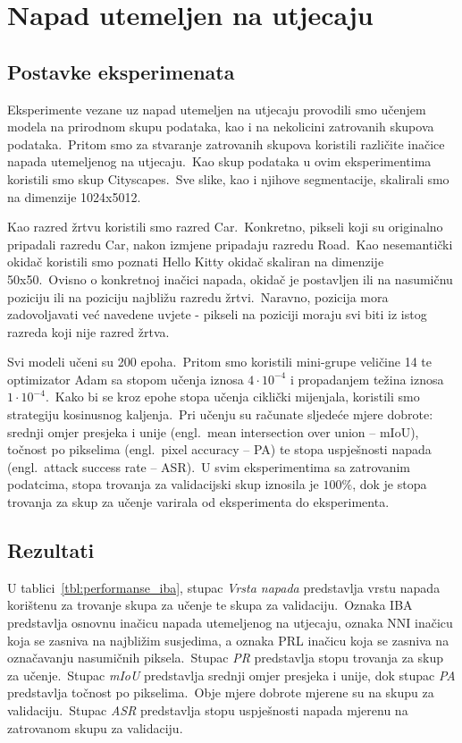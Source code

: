 \documentclass[times, utf8, seminar, numeric]{fer}
\begin{document}
\section{Napad utemeljen na utjecaju}

\subsection{Postavke eksperimenata}

Eksperimente vezane uz napad utemeljen na utjecaju provodili smo učenjem modela na prirodnom skupu podataka, kao i na nekolicini zatrovanih skupova podataka.\ 
Pritom smo za stvaranje zatrovanih skupova koristili različite inačice napada utemeljenog na utjecaju.\ Kao skup podataka u ovim eksperimentima koristili smo skup Cityscapes.\ 
Sve slike, kao i njihove segmentacije, skalirali smo na dimenzije 1024x5012.\ 
  
Kao razred žrtvu koristili smo razred Car.\ Konkretno, pikseli koji su originalno pripadali razredu Car, nakon izmjene pripadaju razredu Road.\ 
Kao nesemantički okidač koristili smo poznati Hello Kitty okidač skaliran na dimenzije 50x50.\ 
Ovisno o konkretnoj inačici napada, okidač je postavljen ili na nasumičnu poziciju ili na poziciju najbližu razredu žrtvi.\ 
Naravno, pozicija mora zadovoljavati već navedene uvjete - pikseli na poziciji moraju svi biti iz istog razreda koji nije razred žrtva.\ 
  
Svi modeli učeni su 200 epoha.\ Pritom smo koristili mini-grupe veličine 14 te optimizator Adam sa stopom učenja iznosa $4 \cdot 10^{-4}$ i propadanjem težina iznosa $1 \cdot 10^{-4}$.\
Kako bi se kroz epohe stopa učenja ciklički mijenjala, koristili smo strategiju kosinusnog kaljenja.\ 
Pri učenju su računate sljedeće mjere dobrote: srednji omjer presjeka i unije (engl.\ mean intersection over union – mIoU), točnost po pikselima (engl.\ pixel accuracy – PA) te stopa uspješnosti napada (engl.\ attack success rate – ASR).\ 
U svim eksperimentima sa zatrovanim podatcima, stopa trovanja za validacijski skup iznosila je $100\%$, dok je stopa trovanja za skup za učenje varirala od eksperimenta do eksperimenta.\ 

\pagebreak

\subsection{Rezultati}

U tablici~\ref{tbl:performanse_iba}, stupac \textit{Vrsta napada} predstavlja vrstu napada korištenu za trovanje skupa za učenje te skupa za validaciju.\ 
Oznaka IBA predstavlja osnovnu inačicu napada utemeljenog na utjecaju, oznaka NNI inačicu koja se zasniva na najbližim susjedima, a oznaka PRL inačicu koja se zasniva na označavanju nasumičnih piksela.\ 
Stupac \textit{PR} predstavlja stopu trovanja za skup za učenje.\ Stupac \textit{mIoU} predstavlja srednji omjer presjeka i unije, dok stupac \textit{PA} predstavlja točnost po pikselima.\ 
Obje mjere dobrote mjerene su na skupu za validaciju.\ Stupac \textit{ASR} predstavlja stopu uspješnosti napada mjerenu na zatrovanom skupu za validaciju.\
\end{document}
